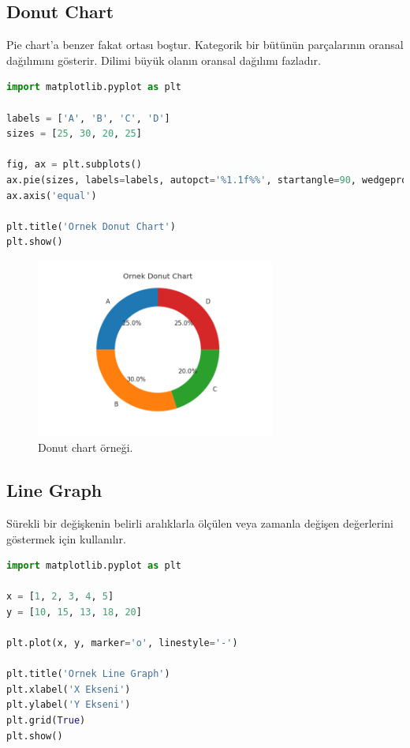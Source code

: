 \newpage

\subsection{Donut Chart}
Pie chart'a benzer fakat ortası boştur. Kategorik bir bütünün parçalarının oransal dağılımını gösterir. Dilimi büyük olanın oransal dağılımı fazladır.

\begin{lstlisting}[language=Python]
import matplotlib.pyplot as plt

labels = ['A', 'B', 'C', 'D']
sizes = [25, 30, 20, 25]

fig, ax = plt.subplots()
ax.pie(sizes, labels=labels, autopct='%1.1f%%', startangle=90, wedgeprops=dict(width=0.3))
ax.axis('equal')

plt.title('Ornek Donut Chart')
plt.show()
\end{lstlisting}

\begin{figure}[h]
    \centering
    \includegraphics[width=0.7\textwidth]{images/donut_chart.png}
    \caption{Donut chart örneği.}
    \label{fig:enter-label}
\end{figure}

\newpage

\subsection{Line Graph}
Sürekli bir değişkenin belirli aralıklarla ölçülen veya zamanla değişen değerlerini göstermek için kullanılır.

\begin{lstlisting}[language=Python]
import matplotlib.pyplot as plt

x = [1, 2, 3, 4, 5]
y = [10, 15, 13, 18, 20]

plt.plot(x, y, marker='o', linestyle='-')

plt.title('Ornek Line Graph')
plt.xlabel('X Ekseni')
plt.ylabel('Y Ekseni')
plt.grid(True)
plt.show()

\end{lstlisting}

